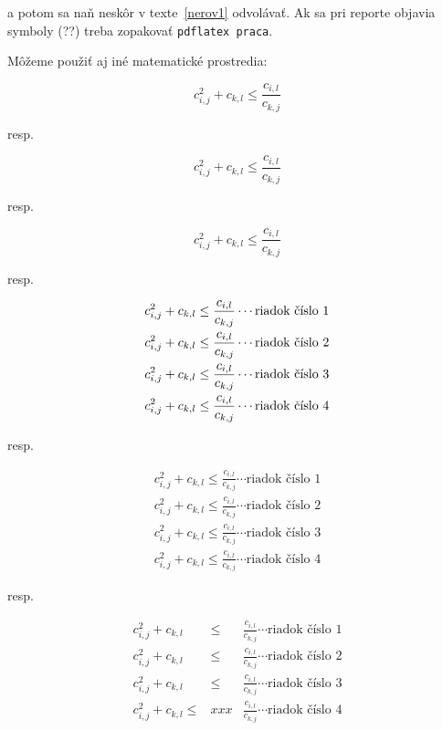 a potom sa naň neskôr v texte~\eqref{nerov1} odvolávať. Ak sa pri reporte objavia symboly
(??) treba zopakovať \verb|pdflatex praca|.


Môžeme použiť aj iné matematické prostredia:

$$
c_{i,j}^2+c_{k,l} \le \frac{c_{i,l}}{c_{k,j}}
$$

resp.

\begin{displaymath}
c_{i,j}^2+c_{k,l} \le \frac{c_{i,l}}{c_{k,j}}
\end{displaymath}

resp.

\begin{equation*}
c_{i,j}^2+c_{k,l} \le \frac{c_{i,l}}{c_{k,j}}
\end{equation*}

resp.

\begin{multline*}
c_{i,j}^2+c_{k,l} \le \frac{c_{i,l}}{c_{k,j}} \cdots \mbox{riadok číslo 1} \allowdisplaybreaks\\
c_{i,j}^2+c_{k,l} \le \frac{c_{i,l}}{c_{k,j}} \cdots \mbox{riadok číslo 2} \allowdisplaybreaks\\
c_{i,j}^2+c_{k,l} \le \frac{c_{i,l}}{c_{k,j}} \cdots \mbox{riadok číslo 3} \allowdisplaybreaks\\
c_{i,j}^2+c_{k,l} \le \frac{c_{i,l}}{c_{k,j}} \cdots \mbox{riadok číslo 4}
\end{multline*}

resp.

\begin{multline}
c_{i,j}^2+c_{k,l} \le \frac{c_{i,l}}{c_{k,j}} \cdots \mbox{riadok číslo 1} \\
c_{i,j}^2+c_{k,l} \le \frac{c_{i,l}}{c_{k,j}} \cdots \mbox{riadok číslo 2} \\
c_{i,j}^2+c_{k,l} \le \frac{c_{i,l}}{c_{k,j}} \cdots \mbox{riadok číslo 3} \\
c_{i,j}^2+c_{k,l} \le \frac{c_{i,l}}{c_{k,j}} \cdots \mbox{riadok číslo 4}
\label{vztah-22}
\end{multline}

resp.

\begin{eqnarray*}
c_{i,j}^2+c_{k,l} &\le& \frac{c_{i,l}}{c_{k,j}} \cdots \mbox{riadok číslo 1} \\
c_{i,j}^2+c_{k,l} &\le& \frac{c_{i,l}}{c_{k,j}} \cdots \mbox{riadok číslo 2} \\
c_{i,j}^2+c_{k,l} &\le& \frac{c_{i,l}}{c_{k,j}} \cdots \mbox{riadok číslo 3} \\
c_{i,j}^2+c_{k,l} \le  &xxx& \frac{c_{i,l}}{c_{k,j}} \cdots \mbox{riadok číslo 4}
\end{eqnarray*}

